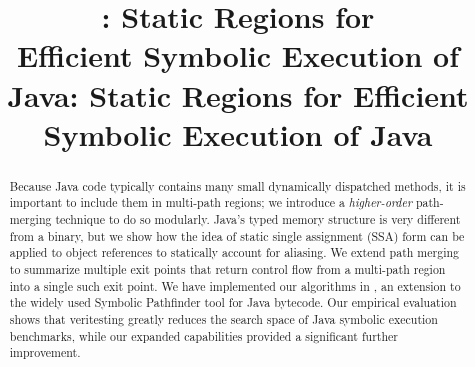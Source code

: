\documentclass[sigconf,review, anonymous]{acmart}
\begin{document}
\begin{abstract}
Because Java code typically contains many small dynamically dispatched
methods, it is important to include them in multi-path regions; we
introduce a {\em higher-order} path-merging technique to do so
modularly.
%
Java's typed memory structure is very different from a binary, but we
show how the idea of static single assignment (SSA) form can be
applied to object references to statically account for aliasing.
%
We extend path merging to summarize multiple exit points that return control flow from a multi-path region
into a single such exit point.
%
We have implemented our algorithms in \tool, an extension to the
widely used Symbolic Pathfinder tool for Java bytecode.
%
Our empirical evaluation shows that veritesting greatly reduces the
search space of Java symbolic execution benchmarks, while our expanded
capabilities provided a significant further improvement.



\end{abstract}
\title{\tool: Static Regions for\\Efficient Symbolic Execution of Java}
\maketitle
\title{\tool: Static Regions for Efficient Symbolic Execution of Java}




%
%


%






\newpage
\clearpage

\end{document}
